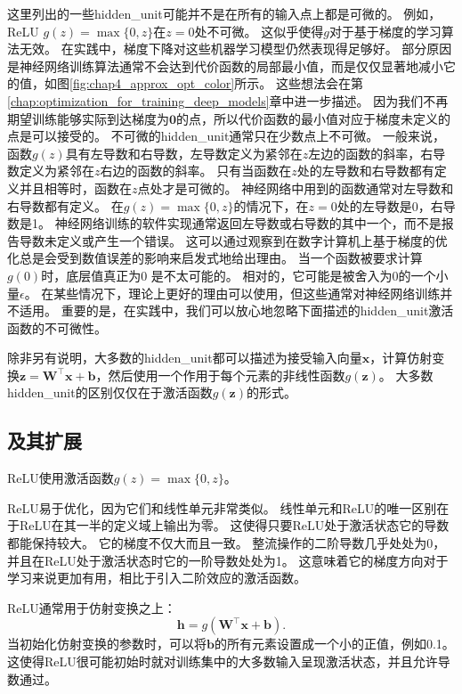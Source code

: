 这里列出的一些\gls{hidden_unit}可能并不是在所有的输入点上都是可微的。
例如，\gls{ReLU} $g(z)=\max\{0, z\}$在$z=0$处不可微。
这似乎使得$g$对于基于梯度的学习算法无效。
在实践中，梯度下降对这些机器学习模型仍然表现得足够好。
部分原因是神经网络训练算法通常不会达到代价函数的局部最小值，而是仅仅显著地减小它的值，如图\ref{fig:chap4_approx_opt_color}所示。
这些想法会在第\ref{chap:optimization_for_training_deep_models}章中进一步描述。
因为我们不再期望训练能够实际到达梯度为$\bm{0}$的点，所以代价函数的最小值对应于梯度未定义的点是可以接受的。
不可微的\gls{hidden_unit}通常只在少数点上不可微。
一般来说，函数$g(z)$具有左导数和右导数，左导数定义为紧邻在$z$左边的函数的斜率，右导数定义为紧邻在$z$右边的函数的斜率。
只有当函数在$z$处的左导数和右导数都有定义并且相等时，函数在$z$点处才是可微的。
神经网络中用到的函数通常对左导数和右导数都有定义。
在$g(z)=\max\{0,z\}$的情况下，在$z=0$处的左导数是0，右导数是1。
神经网络训练的软件实现通常返回左导数或右导数的其中一个，而不是报告导数未定义或产生一个错误。
这可以通过观察到在数字计算机上基于梯度的优化总是会受到数值误差的影响来启发式地给出理由。
当一个函数被要求计算$g(0)$时，底层值真正为0 是不太可能的。
相对的，它可能是被舍入为0的一个小量$\epsilon$。
在某些情况下，理论上更好的理由可以使用，但这些通常对神经网络训练并不适用。
重要的是，在实践中，我们可以放心地忽略下面描述的\gls{hidden_unit}激活函数的不可微性。


除非另有说明，大多数的\gls{hidden_unit}都可以描述为接受输入向量$\bm{x}$，计算仿射变换$\bm{z}=\bm{W}^\top \bm{x}+\bm{b}$，然后使用一个作用于每个元素的非线性函数$g(\bm{z})$。
大多数\gls{hidden_unit}的区别仅仅在于激活函数$g(\bm{z})$的形式。

\subsection{及其扩展}
\label{sec:rectified_linear_units_and_their_generalizations}

\gls{ReLU}使用激活函数$g(z)=\max\{0, z\}$。

\gls{ReLU}易于优化，因为它们和线性单元非常类似。
线性单元和\gls{ReLU}的唯一区别在于\gls{ReLU}在其一半的定义域上输出为零。
这使得只要\gls{ReLU}处于激活状态它的导数都能保持较大。
它的梯度不仅大而且一致。
整流操作的二阶导数几乎处处为0，并且在\gls{ReLU}处于激活状态时它的一阶导数处处为1。
这意味着它的梯度方向对于学习来说更加有用，相比于引入二阶效应的激活函数。

\gls{ReLU}通常用于仿射变换之上：
\begin{equation}
\bm{h} = g(\bm{W}^\top \bm{x} + \bm{b}).
\end{equation}
当初始化仿射变换的参数时，可以将$\bm{b}$的所有元素设置成一个小的正值，例如0.1。
这使得\gls{ReLU}很可能初始时就对训练集中的大多数输入呈现激活状态，并且允许导数通过。

